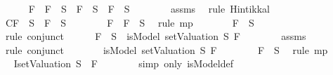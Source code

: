 \begin{isabellebody}
\ \ \ \ \isamarkupfalse%
\ {\isachardoublequoteopen}F{}\ \isactrlbold {\isasymand}\ F{}\ {\isasymin}\ S\ {\isasymlongrightarrow}\ F{}\ {\isasymin}\ S\ {\isasymand}\ F{}\ {\isasymin}\ S{\isachardoublequoteclose}\isanewline
\ \ \ \ \ \ \isamarkupfalse%
\ assms{\isacharparenleft}{}{\isacharparenright}\ \isamarkupfalse%
\ {\isacharparenleft}rule\ Hintikka{\isacharunderscore}l{}{\isacharparenright}\isanewline
\ \ \ \ \isamarkupfalse%
\ \isamarkupfalse%
\ C{\isacharcolon}{\isachardoublequoteopen}F{}\ {\isasymin}\ S\ {\isasymand}\ F{}\ {\isasymin}\ S{\isachardoublequoteclose}\isanewline
\ \ \ \ \ \ \isamarkupfalse%
\ {\isacartoucheopen}F{}\ \isactrlbold {\isasymand}\ F{}\ {\isasymin}\ S{\isacartoucheclose}\ \isamarkupfalse%
\ {\isacharparenleft}rule\ mp{\isacharparenright}\isanewline
\ \ \ \ \isamarkupfalse%
\ \isamarkupfalse%
\ {\isachardoublequoteopen}F{}\ {\isasymin}\ S{\isachardoublequoteclose}\ \isanewline
\ \ \ \ \ \ \isamarkupfalse%
\ {\isacharparenleft}rule\ conjunct{}{\isacharparenright}\isanewline
\ \ \ \ \isamarkupfalse%
\ {\isachardoublequoteopen}F{}\ {\isasymin}\ S\ {\isasymlongrightarrow}\ isModel\ {\isacharparenleft}setValuation\ S{\isacharparenright}\ F{}{\isachardoublequoteclose}\isanewline
\ \ \ \ \ \ \isamarkupfalse%
\ assms{\isacharparenleft}{}{\isacharparenright}\ \isamarkupfalse%
\ {\isacharparenleft}rule\ conjunct{}{\isacharparenright}\isanewline
\ \ \ \ \isamarkupfalse%
\ \isamarkupfalse%
\ {\isachardoublequoteopen}isModel\ {\isacharparenleft}setValuation\ S{\isacharparenright}\ F{}{\isachardoublequoteclose}\isanewline
\ \ \ \ \ \ \isamarkupfalse%
\ {\isacartoucheopen}F{}\ {\isasymin}\ S{\isacartoucheclose}\ \isamarkupfalse%
\ {\isacharparenleft}rule\ mp{\isacharparenright}\isanewline
\ \ \ \ \isamarkupfalse%
\ \isamarkupfalse%
\ I{}{\isacharcolon}{\isachardoublequoteopen}{\isacharparenleft}setValuation\ S{\isacharparenright}\ {\isasymTurnstile}\ F{}{\isachardoublequoteclose}\isanewline
\ \ \ \ \ \ \isamarkupfalse%
\ {\isacharparenleft}simp\ only{\isacharcolon}\ isModel{\isacharunderscore}def{\isacharparenright}\isanewline

\end{isabellebody}
